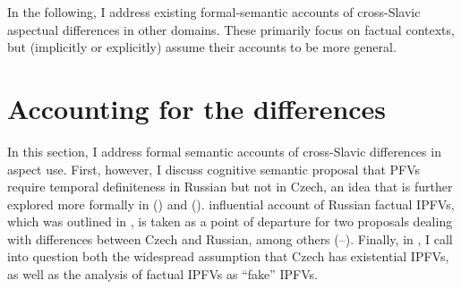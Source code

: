 \documentclass[output=paper,colorlinks,citecolor=brown]{langscibook}
\begin{document}
In the following, I address existing formal-semantic accounts of cross-Slavic aspectual differences in other domains. These primarily focus on factual contexts, but (implicitly or explicitly) assume their accounts to be more general. %

\section{Accounting for the differences}
\label{sec:formal}

\noindent In this section, I address formal semantic accounts of cross-Slavic differences in aspect use. First, however, I discuss  cognitive semantic proposal that PFVs require temporal definiteness in Russian but not in Czech, an idea that is further explored more formally in \citet{Mueller-Reichau2018a,mueller23} () and \citet{klimek22} ().  influential account of Russian factual IPFVs, which was outlined in , is taken as a point of departure for two proposals dealing with differences between Czech and Russian, among others \citep[][]{alvestad13,Mueller-Reichau2018a,mueller23} (--). Finally, in , I call into question both the widespread assumption that Czech has existential IPFVs, as well as the analysis of factual IPFVs as ``fake'' %
IPFVs.   

\subsection{\citet{Dickey2000,dickey15}} 
\label{sec:dickey}
\end{document}

